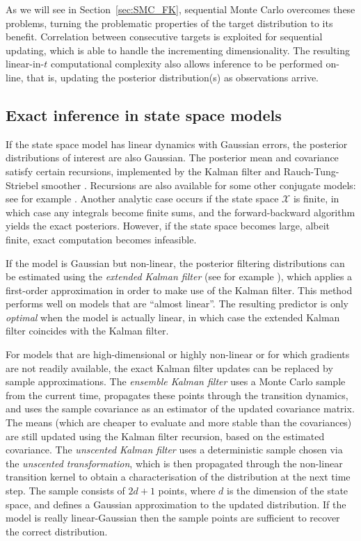 As we will see in Section~\ref{sec:SMC_FK}, sequential Monte Carlo overcomes these problems, turning the problematic properties of the target distribution to its benefit. Correlation between consecutive targets is exploited for sequential updating, which is able to handle the incrementing dimensionality. The resulting linear-in-$t$ computational complexity also allows inference to be performed on-line, that is, updating the posterior distribution(s) as observations arrive.




\subsection{Exact inference in state space models}
\label{sec:SSM_exact_inference}
If the state space model has linear dynamics with Gaussian errors, the posterior distributions of interest are also Gaussian. The posterior mean and covariance satisfy certain recursions, implemented by the Kalman filter \parencite{kalman1960} and Rauch-Tung-Striebel smoother \parencite{rauch1965}. 
Recursions are also available for some other conjugate models: see for example \textcite{vidoni1999}.
Another analytic case occurs if the state space $\mathcal{X}$ is finite, in which case any integrals become finite sums, and the forward-backward algorithm \parencite{baum1970} yields the exact posteriors. However, if the state space becomes large, albeit finite, exact computation becomes infeasible.

If the model is Gaussian but non-linear, the posterior filtering distributions can be estimated using the \emph{extended Kalman filter} (see for example \textcite{jazwinski2007}), which applies a first-order approximation in order to make use of the Kalman filter. This method performs well on models that are ``almost linear''. The resulting predictor is only \emph{optimal} when the model is actually linear, in which case the extended Kalman filter coincides with the Kalman filter.

For models that are high-dimensional or highly non-linear or for which gradients are not readily available, the exact Kalman filter updates can be replaced by sample approximations.
The \emph{ensemble Kalman filter} \parencite{evensen1994} uses a Monte Carlo sample from the current time, propagates these points through the transition dynamics, and uses the sample covariance as an estimator of the updated covariance matrix. The means (which are cheaper to evaluate and more stable than the covariances) are still updated using the Kalman filter recursion, based on the estimated covariance.
The \emph{unscented Kalman filter} \parencite{wan2000} uses a deterministic sample chosen via the \emph{unscented transformation}, which is then propagated through the non-linear transition kernel to obtain a characterisation of the distribution at the next time step. The sample consists of $2d+1$ points, where $d$ is the dimension of the state space, and defines a Gaussian approximation to the updated distribution. If the model is really linear-Gaussian then the sample points are sufficient to recover the correct distribution.

